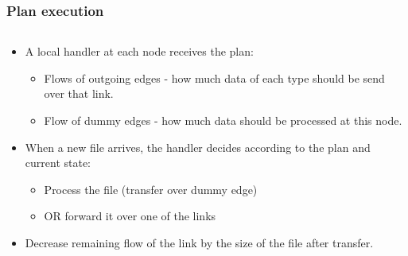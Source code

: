 \documentclass{beamer}
\begin{document}
\begin{frame}\frametitle{Plan execution}

\begin{columns}[c] %

\begin{block}{}
\begin{itemize}
\item A local handler at each node receives the plan:

\begin{itemize}
\footnotesize
\item Flows of outgoing edges - how much data of each type should be send over that link.
\item Flow of dummy edges - how much data should be processed at this node.
 \end{itemize}

\item When a new file arrives, the handler decides according to the plan and current state:

\begin{itemize}
\footnotesize
 \item Process the file (transfer over dummy edge)
 \item OR forward it over one of the links  
 \end{itemize}
 \item Decrease remaining flow of the link by the size of the file after transfer.
\end{itemize}
\end{block}    



\end{columns}
\end{frame}
\end{document}
